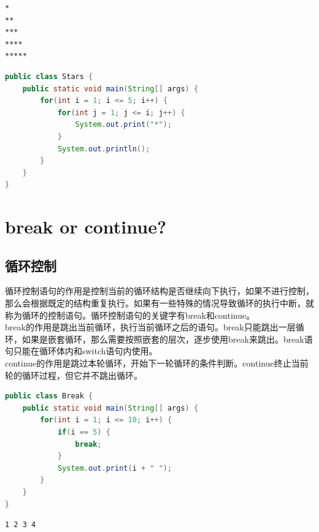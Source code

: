 \vspace{0.5cm}


\begin{lstlisting}
*
**
***
****
*****
\end{lstlisting}

\begin{lstlisting}[language=Java]
public class Stars {
    public static void main(String[] args) {
        for(int i = 1; i <= 5; i++) {
            for(int j = 1; j <= i; j++) {
                System.out.print("*");
            }
            System.out.println();
        }
    }
}
\end{lstlisting}

\newpage

\section{break or continue?}

\subsection{循环控制}

循环控制语句的作用是控制当前的循环结构是否继续向下执行，如果不进行控制，那么会根据既定的结构重复执行。如果有一些特殊的情况导致循环的执行中断，就称为循环的控制语句。循环控制语句的关键字有break和continue。\\

break的作用是跳出当前循环，执行当前循环之后的语句。break只能跳出一层循环，如果是嵌套循环，那么需要按照嵌套的层次，逐步使用break来跳出。break语句只能在循环体内和switch语句内使用。\\

continue的作用是跳过本轮循环，开始下一轮循环的条件判断。continue终止当前轮的循环过程，但它并不跳出循环。\\


\begin{lstlisting}[language=Java]
public class Break {
    public static void main(String[] args) {
        for(int i = 1; i <= 10; i++) {
            if(i == 5) {
                break;
            }
            System.out.print(i + " ");
        }
    }
}
\end{lstlisting}

\begin{tcolorbox}
\begin{verbatim}
1 2 3 4
\end{verbatim}
\end{tcolorbox}

